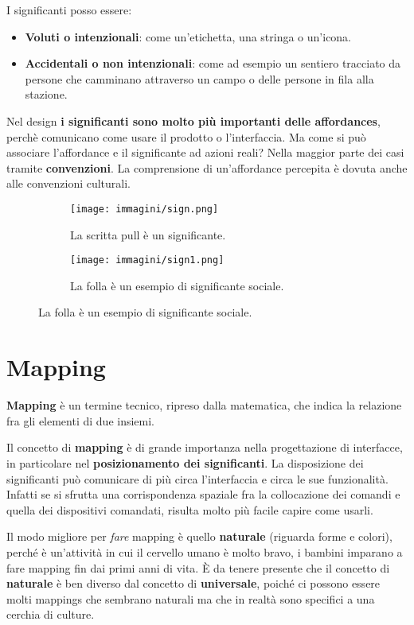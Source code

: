 I significanti posso essere:
\begin{itemize}
	\itemsep-0.3em
	\item \textbf{Voluti o intenzionali}: come un'etichetta, una stringa o un'icona.
	\item \textbf{Accidentali o non intenzionali}: come ad esempio un sentiero tracciato da persone che camminano attraverso un campo o delle persone in
	fila alla stazione.
\end{itemize}
Nel design \textbf{i significanti sono molto più importanti delle affordances}, perchè comunicano come usare il prodotto o l'interfaccia. Ma come si può
associare l'affordance e il significante ad azioni reali? Nella maggior parte dei casi tramite \textbf{convenzioni}. La comprensione di un'affordance
percepita è dovuta anche alle convenzioni culturali.

\begin{figure}[h!]
	\begin{subfigure}{0.49 \linewidth} \centering
			\texttt{[image: immagini/sign.png]}
			\caption{La scritta pull è un significante.}
	\end{subfigure}
	\begin{subfigure}{0.49 \linewidth} \centering
			\texttt{[image: immagini/sign1.png]}
			\caption{La folla è un esempio di significante sociale.}
	\end{subfigure}
\end{figure}

\section{Mapping}
\textbf{Mapping} è un termine tecnico, ripreso dalla matematica, che indica la relazione fra gli elementi di due insiemi.

Il concetto di \textbf{mapping} è di grande importanza nella progettazione di interfacce, in particolare nel \textbf{posizionamento dei significanti}.
La disposizione dei significanti può comunicare di più circa l'interfaccia e circa le sue funzionalità. Infatti se si sfrutta una corrispondenza spaziale
fra la collocazione dei comandi e quella dei dispositivi comandati, risulta molto più facile capire come usarli.

Il modo migliore per \textit{fare} mapping è quello \textbf{naturale} (riguarda forme e colori), perché è un'attività in cui il cervello umano è molto
bravo, i bambini imparano a fare mapping fin dai primi anni di vita. È da tenere presente che il concetto di \textbf{naturale} è ben diverso dal
concetto di \textbf{universale}, poiché ci possono essere molti mappings che sembrano naturali ma che in realtà sono specifici a una cerchia di culture.

